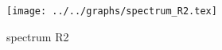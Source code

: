 \begin{figure}[h] \centering\texttt{[image: ../../graphs/spectrum\_R2.tex]}\caption{spectrum R2}\label{gr:spectrum_R2} \end{figure}
